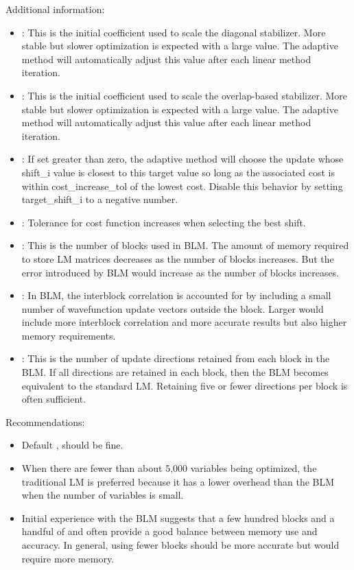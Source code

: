 Additional information:
\begin{itemize}
  \item {}:  This is the initial coefficient used to scale the diagonal stabilizer.
                            More stable but slower optimization is expected with a large value.
                            The adaptive method will automatically adjust this value after each linear method iteration.
  \item {}:  This is the initial coefficient used to scale the overlap-based stabilizer.
                            More stable but slower optimization is expected with a large value.
                            The adaptive method will automatically adjust this value after each linear method iteration.
  \item {}:  If set greater than zero, the adaptive method will choose the update whose shift\_i value is closest to
                              this target value so long as the associated cost is within cost\_increase\_tol of the lowest cost.
                              Disable this behavior by setting target\_shift\_i to a negative number.
  \item {}:  Tolerance for cost function increases when selecting the best shift.
  \item {}:   This is the number of blocks used in BLM. The amount of memory required to store LM matrices decreases
                            as the number of blocks increases. But the error introduced by BLM would increase as the number of blocks increases.  
  \item {}:     In BLM, the interblock correlation is accounted for by including a small number of wavefunction update vectors
                            outside the block. Larger  would include more interblock correlation and more accurate results but 
                            also higher memory requirements. 
  \item {}:     This is the number of update directions retained from each block in the BLM. If all directions are retained in each block, 
                            then the BLM becomes equivalent to the standard LM.  Retaining five or fewer directions per block is often sufficient.
\end{itemize}

Recommendations:
\begin{itemize}
  \item Default ,  should be fine. 
  \item When there are fewer than about 5,000 variables being optimized, the traditional LM is preferred because it has a lower overhead than the BLM when the number of variables is small.
  \item Initial experience with the BLM suggests that a few hundred blocks and a handful of  and 
        often provide a good balance between memory use and accuracy.  In general, using fewer blocks should be more accurate but would require more memory.
\end{itemize}

